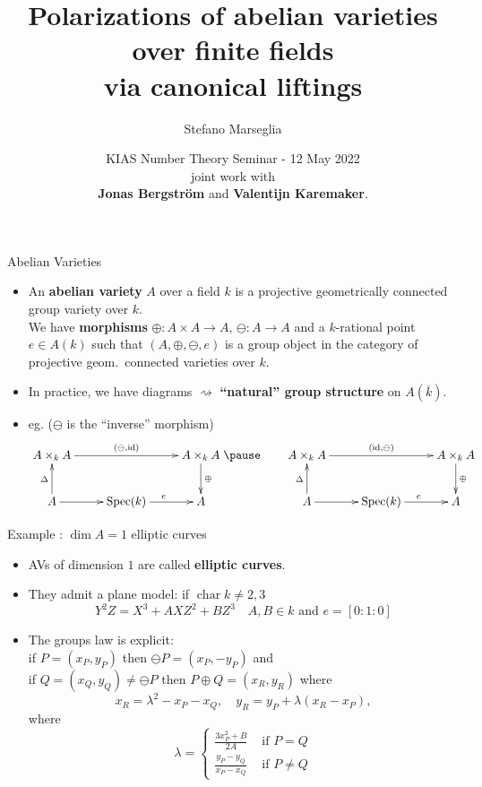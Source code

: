\documentclass[usenames,dvipsnames,handout]{beamer}
\title[]{Polarizations of abelian varieties over finite fields\\ via canonical liftings}
\subtitle{}
\author[Stefano Marseglia]{Stefano Marseglia\\}
\institute[]{Utrecht University}
\date[12 May 2022]{KIAS Number Theory Seminar - 12 May 2022\\ \pause joint work with\\ {\bf Jonas Bergstr\"om} and {\bf Valentijn Karemaker}.}
\DeclareMathOperator{\Char}{char}
\begin{document}
\begin{frame}
\titlepage
\end{frame}


\begin{frame}{ Abelian Varieties }
	\begin{itemize}
	 \item An {\bf abelian variety} $A$ over a field $k$ is a projective geometrically connected group variety over $k$.\\
	 \pause We have {\bf morphisms} $\oplus:A\times A \to A$, $\ominus:A\to A$ and a $k$-rational point $e\in A(k)$ such that $(A,\oplus,\ominus,e)$ is a group object in the category of projective geom.~connected varieties over $k$.
	 \pause \item In practice, we have {diagrams $\rightsquigarrow$} {\bf ``natural'' group structure} on $A(\overline k)$.
	 \pause \item eg. ($\ominus$ is the ``inverse'' morphism)
	 {\tiny
	 \[ 
	 	\xymatrix{
	 		A\times_k A \ar[rr]^{(\ominus,\mathrm{id})} 	& 						& A\times_k A \ar[d]^{\oplus}\\
	 		A \ar[u]^{\Delta} \ar[r] 	& \mathrm{Spec}(k) \ar[r]^{e}	& A 
	 	}
	 	\pause \qquad
	 	\xymatrix{
	 		A\times_k A \ar[rr]^{(\mathrm{id},\ominus)} 	& 						& A\times_k A \ar[d]^{\oplus}\\
	 		A \ar[u]^{\Delta} \ar[r] 	& \mathrm{Spec}(k) \ar[r]^{e}	& A 
	 	}
	  \]}
	\end{itemize}
\end{frame}

\begin{frame}{ Example : $\dim A=1$ elliptic curves  }
	\begin{itemize}
		\item AVs of dimension $1$ are called {\bf elliptic curves}.
		\pause \item They admit a {plane model}: if $\Char k \neq 2,3$
		\[  Y^2Z = X^3 +AXZ^2 + BZ^3\quad A,B \in k\text{ and }e=[0:1:0]  \]
		\pause \vspace{-0.7cm} \item The {groups law is explicit}:\\
		if $P=(x_P,y_P) $ then $ \ominus P=(x_P,-y_P) $ and\\
		\pause if $Q=(x_Q,y_Q)\neq \ominus P$ then $P\oplus Q=(x_R,y_R)$ where
		\[ x_R = \lambda^2 -x_P-x_Q, \quad y_R = y_P+\lambda (x_R-x_P), \]
		where
		\[ \lambda = 
		\begin{cases}
			\frac{3x_P^2 + B}{2A}& \text{ if } P=Q  \\
			\frac{y_P -y_Q}{x_P - x_Q} &  \text{ if } P\neq Q
		\end{cases}
		\]	
	\end{itemize}
\end{frame}
\end{document}
